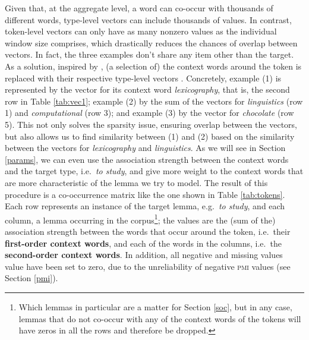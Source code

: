 \documentclass[
]{book}
\begin{document}
Given that, at the aggregate level, a word can co-occur with thousands of different words, type-level vectors can include thousands of values. In contrast, token-level vectors can only have as many nonzero values as the individual window size comprises, which drastically reduces the chances of overlap between vectors. In fact, the three examples don't share any item other than the target. As a solution, inspired by \textcite{schutze_1998}, (a selection of) the context words around the token is replaced with their respective type-level vectors \autocite{heylen.etal_2012,heylen.etal_2015,depascale_2019}.
Concretely, example (1) is represented by the vector for its context word \emph{lexicography}, that is, the second row in Table \ref{tab:vec1}; example (2) by the sum of the vectors for \emph{linguistics} (row 1) and \emph{computational} (row 3); and example (3) by the vector for \emph{chocolate} (row 5). This not only solves the sparsity issue, ensuring overlap between the vectors, but also allows us to find similarity between (1) and (2) based on the similarity between the vectors for \emph{lexicography} and \emph{linguistics}. As we will see in Section \ref{params}, we can even use the association strength between the context words and the target type, i.e.~\emph{to study}, and give more weight to the context words that are more characteristic of the lemma we try to model.
The result of this procedure is a co-occurrence matrix like the one shown in Table \ref{tab:tokens}. Each row represents an instance of the target lemma, e.g.~\emph{to study}, and each column, a lemma occurring in the corpus\footnote{Which lemmas in particular are a matter for Section \ref{soc}, but in any case, lemmas that do not co-occur with any of the context words of the tokens will have zeros in all the rows and therefore be dropped.}; the values are the (sum of the) association strength between the words that occur around the token, i.e.~their \textbf{first-order context words}, and each of the words in the columns, i.e.~the \textbf{second-order context words}. In addition, all negative and missing values value have been set to zero, due to the unreliability of negative \textsc{pmi} values (see Section \ref{pmi}).



\begin{table}

\caption{\label{tab:tokens}Small example of token-level vectors of three artificial instances of \emph{to study}.}
\centering
{}
\end{table}
\end{document}
